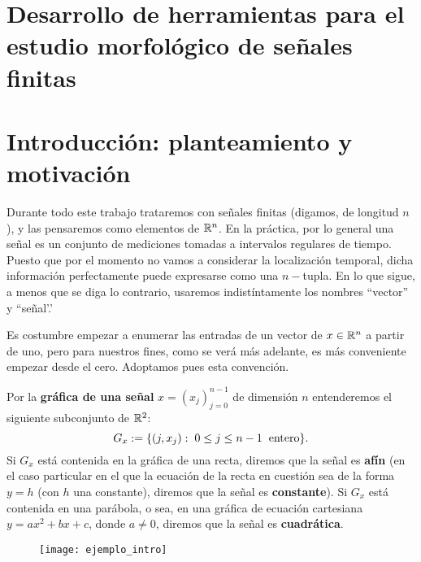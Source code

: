 
\section{Desarrollo de herramientas para el estudio morfológico de señales finitas}
\section{Introducción: planteamiento y motivación}

Durante todo este trabajo trataremos con señales
finitas
(digamos, de
longitud $n$), y las pensaremos como elementos de $\mathbb{R}^{n}$.
En la práctica, por lo general
una señal es un conjunto de mediciones tomadas
a intervalos regulares de tiempo.
Puesto que por el momento no vamos
a considerar la localización temporal, dicha
información perfectamente puede expresarse como 
una $n-$tupla. En lo que sigue, a menos que se diga
lo contrario, usaremos indistíntamente los nombres
``vector'' y ``señal'.'

Es costumbre empezar
a enumerar las entradas de un vector
de $x \in \mathbb{R}^{n}$ a partir de uno, pero
para nuestros fines,
como se verá más adelante, es más 
conveniente empezar desde el cero.
Adoptamos pues esta convención.


\begin{defi}
Por la \textbf{gráfica de una señal} $x=(x_{j})_{j=0}^{n-1}$
de dimensión $n$ entenderemos
 el siguiente subconjunto de $\mathbb{R}^{2}$:
\[
G_{x} := 
\{ (j, x_{j} ) : \hspace{0.1cm} 0 \leq j \leq n-1
\hspace{0.2cm} \text{entero}\} .
\]
Si $G_{x}$ está contenida en la gráfica de una recta, diremos que la
señal es \textbf{afín}
(en el caso particular en el que
la ecuación de la recta en cuestión sea de la forma $y= h$
(con $h$ una constante),
diremos que la señal es
\textbf{constante}). Si  $G_{x}$ está contenida en 
una parábola, o sea, en una
gráfica de ecuación cartesiana
$y=ax^{2}+ bx +c$, donde $a \neq 0$, diremos 
que la señal es \textbf{cuadrática}.
\end{defi}


\begin{figure}[H]
	\texttt{[image: ejemplo\_intro]} 
 \end{figure}

